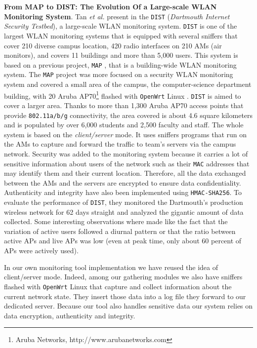 \textbf{From MAP to DIST: The Evolution Of a Large-scale WLAN Monitoring System}. Tan \textit{et al.} present in \citep{article3} the \texttt{DIST} (\textit{Dartmouth Internet Security Testbed}), a large-scale WLAN monitoring system. \texttt{DIST} is one of the largest WLAN monitoring systems that is equipped with several sniffers that cover 210 diverse campus location, 420 radio interfaces on 210 AMs (air monitors), and covers 11 buildings and more than 5,000 users. This system is based on a previous project, \texttt{MAP} \cite{MAP}, that is a building-wide WLAN monitoring system. The \texttt{MAP} project was more focused on a security WLAN monitoring system and covered a small area of the campus, the computer-science department building, with 20 Aruba AP70\footnote{Aruba Networks, http://www.arubanetworks.com} flashed with \texttt{OpenWrt} Linux \cite{openwrt}. \texttt{DIST} is aimed to cover a larger area. Thanks to more than 1,300 Aruba AP70 access points that provide \texttt{802.11a/b/g} connectivity, the area covered is about 4.6 square kilometers and is populated by over 6,000 students and 2,500 faculty and staff. The whole system is based on the \textit{client/server} mode. It uses sniffers programs that run on the AMs to capture and forward the traffic to team's servers via the campus network. Security was added to the monitoring system because it carries a lot of sensitive information about users of the network such as their \texttt{MAC} addresses that may identify them and their current location. Therefore, all the data exchanged between the AMs and the servers are encrypted to ensure data confidentiality. Authenticity and integrity have also been implemented using \texttt{HMAC-SHA256}. To evaluate the performance of \texttt{DIST}, they monitored the Dartmouth's production wireless network for 62 days straight and analyzed the gigantic amount of data collected. Some interesting observations where made like the fact that the variation of active users followed a diurnal pattern or that the ratio between active APs and live APs was low (even at peak time, only about 60 percent of APs were actively used).

In our own monitoring tool implementation we have reused the idea of client/server mode. Indeed, among our gathering modules we also have sniffers flashed with \texttt{OpenWrt} Linux that capture and collect information about the current network state. They insert those data into a log file they forward to our dedicated server. Because our tool also handles sensitive data our system relies on data encryption, authenticity and integrity.


